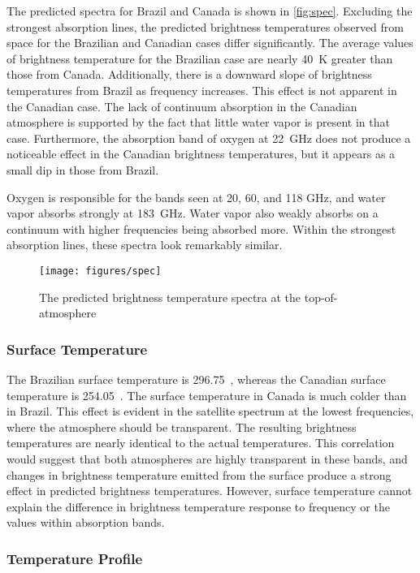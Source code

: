 \documentclass[twocol]{ametsoc}
\begin{document}
The predicted spectra for Brazil and Canada is shown in \autoref{fig:spec}.
Excluding the strongest absorption lines, the predicted brightness temperatures observed from space for the Brazilian and Canadian cases differ significantly.
The average values of brightness temperature for the Brazilian case are nearly 40~K greater than those from Canada.
Additionally, there is a downward slope of brightness temperatures from Brazil as frequency increases.
This effect is not apparent in the Canadian case.
The lack of continuum absorption in the Canadian atmosphere is supported by the fact that little water vapor is present in that case.
Furthermore, the absorption band of oxygen at 22~GHz does not produce a noticeable effect in the Canadian brightness temperatures, but it appears as a small dip in those from Brazil.

Oxygen is responsible for the bands seen at 20, 60, and 118 GHz, and water vapor absorbs strongly at 183~GHz. Water vapor also weakly absorbs on a continuum with higher frequencies being absorbed more.
Within the strongest absorption lines, these spectra look remarkably similar.

\begin{figure}
	\centering
	\texttt{[image: figures/spec]}
	\caption{The predicted brightness temperature spectra at the top-of-atmosphere}
	\label{fig:spec}
\end{figure}

\subsubsection{Surface Temperature}

The Brazilian surface temperature is 296.75~, whereas the Canadian surface temperature is 254.05~.
The surface temperature in Canada is much colder than in Brazil.
This effect is evident in the satellite spectrum at the lowest frequencies, where the atmosphere should be transparent.
The resulting brightness temperatures are nearly identical to the actual temperatures.
This correlation would suggest that both atmospheres are highly transparent in these bands, and changes in brightness temperature emitted from the surface produce a strong effect in predicted brightness temperatures.
However, surface temperature cannot explain the difference in brightness temperature response to frequency or the values within absorption bands.

\subsubsection{Temperature Profile}
\end{document}

